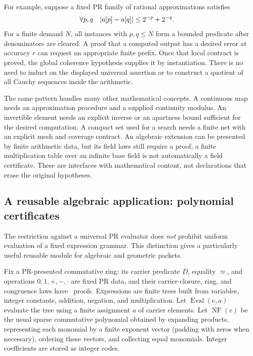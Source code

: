 For example, suppose a fixed PR family of rational approximations satisfies
\[
 \forall p,q\quad
 \lvert a[p]-a[q]\rvert\le 2^{-p}+2^{-q}.
\]
For a finite demand $N$, all instances with $p,q\le N$ form a bounded
predicate after denominators are cleared.  A proof that a computed output
has a desired error at accuracy $r$ can request an appropriate finite
prefix.  Once that local contract is proved, the global coherence hypothesis
supplies it by instantiation.  There is no need to induct on the displayed
universal assertion or to construct a quotient of all Cauchy sequences
inside the arithmetic.

The same pattern handles many other mathematical concepts.  A continuous
map needs an approximation procedure and a supplied continuity modulus.
An invertible element needs an explicit inverse or an apartness bound
sufficient for the desired computation.  A compact set used for a search
needs a finite net with an explicit mesh and coverage contract.  An algebraic
extension can be presented by finite arithmetic data, but its field laws
still require a proof; a finite multiplication table over an infinite base
field is not automatically a field certificate.  These are interfaces with
mathematical content, not declarations that erase the original hypotheses.

\subsection{A reusable algebraic application: polynomial certificates}
\label{sec:polynomial-certificates}

The restriction against a universal PR evaluator does \emph{not} prohibit
uniform evaluation of a fixed expression grammar.  This distinction gives a
particularly useful reusable module for algebraic and geometric packets.

Fix a PR-presented commutative ring: its carrier predicate $D$, equality
$\simeq$, and operations $0,1,+,-,\cdot$ are fixed PR data, and their carrier-closure, ring,
and congruence laws have \ipra\ proofs.  Expressions are finite trees built
from variables, integer constants, addition, negation, and multiplication.
Let $\operatorname{Eval}(e,a)$ evaluate the tree using a finite assignment
$a$ of carrier elements.  Let $\operatorname{NF}(e)$ be the usual sparse
commutative polynomial obtained by expanding products, representing each
monomial by a finite exponent vector (padding with zeros when necessary),
ordering these vectors, and collecting equal monomials.  Integer coefficients are stored as integer codes.

